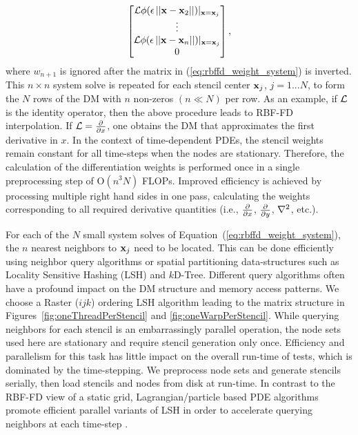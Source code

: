 \documentclass[11pt]{report}
\begin{document}
{\begin{align}
\begin{bmatrix}
                \mathcal{L}\phi(\epsilon\left|\left|\mathbf{x}-\mathbf{x}_{2}\right|\right|)|_{\mathbf{x}=\mathbf{x}_{j}} \\ \vdots \\  \mathcal{L}\phi(\epsilon\left|\left|\mathbf{x}-\mathbf{x}_{n}\right|\right|)|_{\mathbf{x}=\mathbf{x}_{j}}\\
                0
\end{bmatrix},
\label{eq:rbffd_weight_system}
\end{align}
where $w_{n+1}$ is ignored after the matrix in ({\ref{eq:rbffd_weight_system}}) is inverted.
This $n \times n$ system solve is repeated for each stencil center  $\mathbf{x}_j$, $j=1...N$, to form the $N$ rows of the DM  with $n$ non-zeros $(n\ll N)$ per row.
As an example, if $\diffop$ is the identity operator, 
then the above procedure leads to RBF-FD interpolation. If $\mathcal{L}=\frac{\partial }{\partial x}$, one obtains the DM that approximates the first derivative in $x$. In the context of time-dependent PDEs,  the stencil weights remain constant for all time-steps when the nodes are stationary. Therefore, the calculation of the 
differentiation weights is performed once in a single preprocessing step of O$(n^3N)$ 
FLOPs.
Improved efficiency is achieved
by processing multiple right hand sides in one pass, calculating the weights
corresponding to all required derivative quantities (i.e., $\frac{\partial }{\partial x}$, $\frac{\partial }{\partial y}$, $\Laplacian$, etc.).


For each of the $N$ small system solves of Equation~(\ref{eq:rbffd_weight_system}), the $n$ nearest neighbors to $\mathbf{x}_j$ need to be located. This can be done efficiently using neighbor query algorithms or spatial partitioning data-structures such as Locality Sensitive Hashing (LSH) and $k$D-Tree. Different query algorithms often have a profound impact on the DM structure and memory access patterns. We choose a Raster ($ijk$) ordering LSH algorithm \cite{Bollig2011} leading to the matrix structure in Figures~\ref{fig:oneThreadPerStencil} and \ref{fig:oneWarpPerStencil}. While querying neighbors for each stencil is an embarrassingly parallel operation, the node sets used here are stationary and require stencil generation only once. Efficiency and parallelism for this task has little impact on the overall run-time of tests, which is dominated by the time-stepping. We preprocess node sets and generate stencils serially, then load stencils and nodes from disk at run-time. In contrast to the RBF-FD view of a static grid, Lagrangian/particle based PDE algorithms promote efficient parallel variants of LSH in order to accelerate querying neighbors at each time-step \cite{Pan2011, Goswami2010}. 

}
\end{document}
